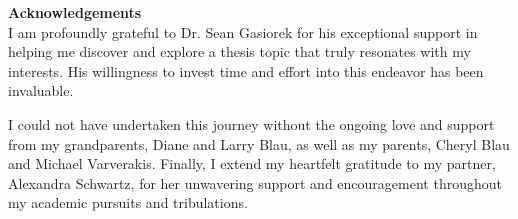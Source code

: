 \textbf{\large Acknowledgements} \\
I am profoundly grateful to Dr. Sean Gasiorek for his exceptional support in helping me discover and explore a thesis topic that truly resonates with my interests. His willingness to invest time and effort into this endeavor has been invaluable.

I could not have undertaken this journey without the ongoing love and support from my grandparents, Diane and Larry Blau, as well as my parents, Cheryl Blau and Michael Varverakis. Finally, I extend my heartfelt gratitude to my partner, Alexandra Schwartz, for her unwavering support and encouragement throughout my academic pursuits and tribulations.

